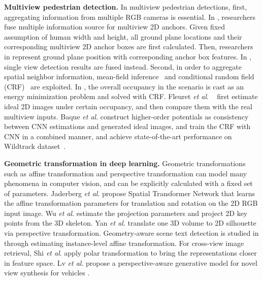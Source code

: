 \documentclass[runningheads]{llncs}
\newcommand{\etal}{\textit{et al}. }
\begin{document}
\textbf{Multiview pedestrian detection.} 
In multiview pedestrian detections, first, aggregating information from multiple RGB cameras is essential. In \cite{chavdarova2017deep,baque2017deep}, researchers fuse multiple information source for multiview 2D anchors. Given fixed assumption of human width and height, all ground plane locations and their corresponding multiview 2D anchor boxes are first calculated. Then, researchers in \cite{chavdarova2017deep,baque2017deep} represent ground plane position with corresponding anchor box features. In \cite{fleuret2007multicamera,xu2016multi,roig2011conditional}, single view detection results are fused instead. 
Second, in order to aggregate spatial neighbor information, mean-field inference~\cite{fleuret2007multicamera,baque2017deep} and conditional random field (CRF)~\cite{roig2011conditional,baque2017deep} are exploited. 
In \cite{fleuret2007multicamera,baque2017deep}, the overall occupancy in the scenario is cast as an energy minimization problem and solved with CRF. 
Fleuret \etal ~\cite{fleuret2007multicamera} first estimate ideal 2D images under certain occupancy, and then compare them with the real multiview inputs. 
Baque \etal \cite{baque2017deep} construct higher-order potentials as consistency between CNN estimations and generated ideal images, and train the CRF with CNN in a combined manner, and achieve state-of-the-art performance on Wildtrack dataset~\cite{chavdarova2018wildtrack}.


\textbf{Geometric transformation in deep learning.} Geometric transformations such as affine transformation and perspective transformation can model many phenomena in computer vision, and can be explicitly calculated with a fixed set of parameters. Jaderberg \etal \cite{jaderberg2015spatial} propose Spatial Transformer Network that learns the affine transformation parameters for translation and rotation on the 2D RGB input image. Wu \etal \cite{wu2016single} estimate the projection parameters and project 2D key points from the 3D skeleton. Yan \etal \cite{yan2016perspective} translate one 3D volume to 2D silhouette via perspective transformation. Geometry-aware scene text detection is studied in \cite{wang2018geometry} through estimating instance-level affine transformation. For cross-view image retrieval, Shi \etal \cite{shi2019spatial} apply polar transformation to bring the representations closer in feature space. 
Lv \etal propose a perspective-aware generative model for novel view synthesis for vehicles \cite{lv2020pose}. 
\end{document}
